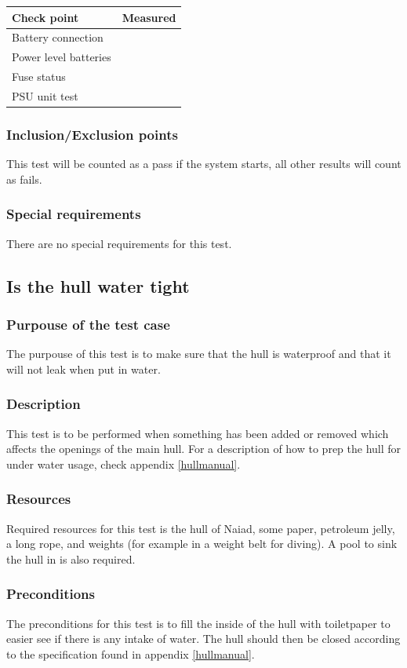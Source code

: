 \begin{tabular}{| l | c |}
\hline
Check point & Measured \\ \hline
Battery connection &  \\ \hline
Power level batteries &  \\ \hline
Fuse status & \\ \hline
PSU unit test & \\ \hline
\end{tabular} 
\subsubsection*{Inclusion/Exclusion points}
This test will be counted as a pass if the system starts, all other results will count as fails. 
\subsubsection*{Special requirements}
There are no special requirements for this test. 

\subsection{Is the hull water tight}
\subsubsection*{Purpouse of the test case}
The purpouse of this test is to make sure that the hull is waterproof and that it will not leak when put in water. 
\subsubsection*{Description}
This test is to be performed when something has been added or removed which affects the openings of the main hull. For a description of how to prep the hull for under water usage, check appendix \ref{hullmanual}.
\subsubsection*{Resources}
Required resources for this test is the hull of Naiad, some paper, petroleum jelly, a long rope, and weights (for example in a weight belt for diving). A pool to sink the hull in is also required. 
\subsubsection*{Preconditions}
The preconditions for this test is to fill the inside of the hull with toiletpaper to easier see if there is any intake of water. The hull should then be closed according to the specification found in appendix \ref{hullmanual}.
